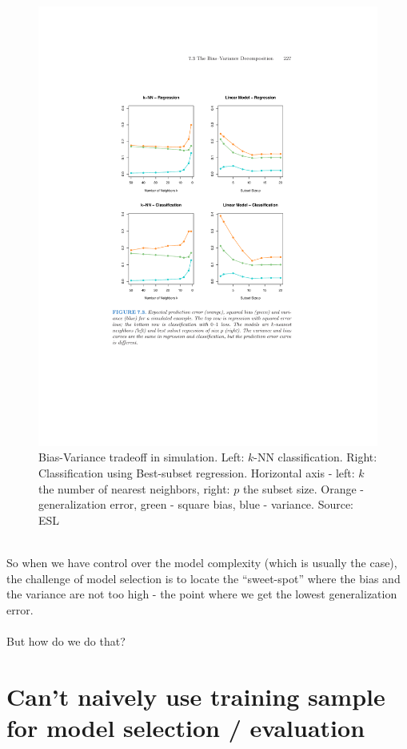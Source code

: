 \documentclass[11pt]{article}
\begin{document}
\begin{figure}[H]
  \centering
  \includegraphics[width=4.5in]{esl_bias_variance_classification.pdf}
  \caption{Bias-Variance tradeoff in simulation. Left: $k$-NN classification. Right:
    Classification using Best-subset regression. Horizontal axis - left: $k$ the number of nearest
    neighbors, right: $p$ the subset size. Orange - generalization error, green
    - square bias, blue - variance.
  Source: ESL}
\end{figure}

~\\
So when we have control over the model complexity (which is usually the case),
the challenge of model selection is to locate the ``sweet-spot'' where the bias
and the variance are not too high - the point where we get the lowest
generalization error.
\\~\\
But how do we do that?



\section{Can't naively use training sample for model selection / evaluation}
\end{document}
